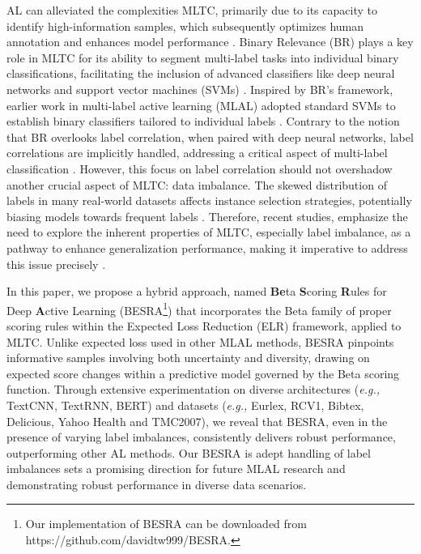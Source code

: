 \documentclass[letterpaper]{article} %
\begin{document}
AL can alleviated the complexities MLTC, primarily due to its capacity to identify high-information samples, which subsequently optimizes human annotation and enhances model performance \citep{REYES2018494, 10.1145/3379504}.
Binary Relevance (BR) plays a key role in MLTC for its ability to segment multi-label tasks into individual binary classifications, facilitating the inclusion of advanced classifiers like deep neural networks and support vector machines (SVMs) \cite{Zhang2018}.
Inspired by BR's framework, earlier work in multi-label active learning (MLAL) adopted standard SVMs to establish binary classifiers tailored to individual labels \cite{mmc2009, adaptive2013, Cherman2019}.
Contrary to the notion that BR overlooks label correlation, when paired with deep neural networks, label correlations are implicitly handled, addressing a critical aspect of multi-label classification \cite{Su2021}.
However, this focus on label correlation should not overshadow another crucial aspect of MLTC: data imbalance. The skewed distribution of labels in many real-world datasets affects instance selection strategies, potentially biasing models towards frequent labels \cite{Wu_Lyu_Ghanem_2016}.
Therefore, recent studies, emphasize the need to explore the inherent properties of MLTC, especially label imbalance, as a pathway to enhance generalization performance, making it imperative to address this issue
precisely \cite{Zhang2018}.

In this paper, we propose a hybrid approach, named \textbf{Be}ta \textbf{S}coring \textbf{R}ules for Deep \textbf{A}ctive Learning (BESRA\footnote{Our implementation of BESRA can be downloaded from https://github.com/davidtw999/BESRA.}) that incorporates the Beta family of proper scoring rules within the Expected Loss Reduction (ELR) framework, applied to MLTC.
Unlike expected loss used in other MLAL methods, BESRA pinpoints informative samples involving both uncertainty and diversity, drawing on expected score changes within a predictive model governed by the Beta scoring function.
Through extensive experimentation on diverse architectures ({\it e.g.,} TextCNN, TextRNN, BERT) and datasets ({\it e.g.,} Eurlex, RCV1, Bibtex, Delicious, Yahoo Health and TMC2007), we reveal that BESRA, even in the presence of varying label imbalances, consistently delivers robust performance, outperforming other AL methods.
Our BESRA is adept handling of label imbalances sets a promising direction for future MLAL research and demonstrating robust performance in diverse data scenarios.
\end{document}
